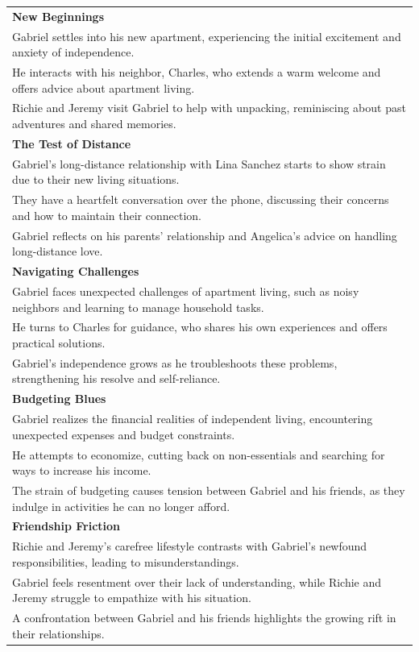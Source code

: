 \begin{small}
\begin{longtable}{p{}}
\textbf{New Beginnings}\\
Gabriel settles into his new apartment, experiencing the initial excitement and anxiety of independence.\\
He interacts with his neighbor, Charles, who extends a warm welcome and offers advice about apartment living.\\
Richie and Jeremy visit Gabriel to help with unpacking, reminiscing about past adventures and shared memories.\\





\textbf{The Test of Distance}\\
Gabriel's long-distance relationship with Lina Sanchez starts to show strain due to their new living situations.\\
They have a heartfelt conversation over the phone, discussing their concerns and how to maintain their connection.\\
Gabriel reflects on his parents' relationship and Angelica's advice on handling long-distance love.\\





\textbf{Navigating Challenges}\\
Gabriel faces unexpected challenges of apartment living, such as noisy neighbors and learning to manage household tasks.\\
He turns to Charles for guidance, who shares his own experiences and offers practical solutions.\\
Gabriel's independence grows as he troubleshoots these problems, strengthening his resolve and self-reliance.\\



\textbf{Budgeting Blues}\\
Gabriel realizes the financial realities of independent living, encountering unexpected expenses and budget constraints.\\
He attempts to economize, cutting back on non-essentials and searching for ways to increase his income.\\
The strain of budgeting causes tension between Gabriel and his friends, as they indulge in activities he can no longer afford.\\





\textbf{Friendship Friction}\\
Richie and Jeremy's carefree lifestyle contrasts with Gabriel's newfound responsibilities, leading to misunderstandings.\\
Gabriel feels resentment over their lack of understanding, while Richie and Jeremy struggle to empathize with his situation.\\
A confrontation between Gabriel and his friends highlights the growing rift in their relationships.\\






\end{longtable}
\end{small}
